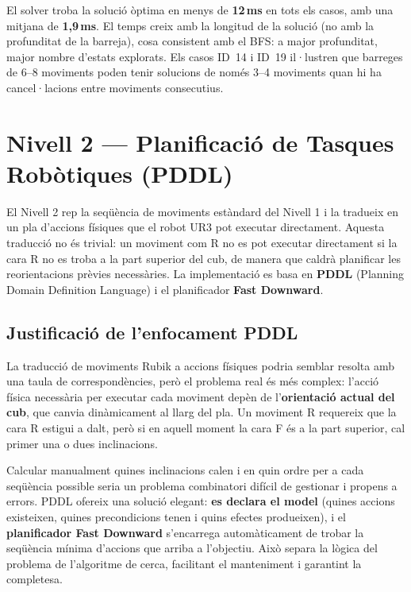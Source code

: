 \documentclass[12pt, a4paper]{article}
\begin{document}
El solver troba la solució òptima en menys de \textbf{12\,ms} en tots els casos, amb una mitjana de \textbf{1{,}9\,ms}. El temps creix amb la longitud de la solució (no amb la profunditat de la barreja), cosa consistent amb el BFS: a major profunditat, major nombre d'estats explorats. Els casos ID~14 i ID~19 il·lustren que barreges de 6--8 moviments poden tenir solucions de només 3--4 moviments quan hi ha cancel·lacions entre moviments consecutius.

\section{Nivell 2 — Planificació de Tasques Robòtiques (PDDL)}

El Nivell 2 rep la seqüència de moviments estàndard del Nivell 1 i la tradueix en un pla d'accions físiques que el robot UR3 pot executar directament. Aquesta traducció no és trivial: un moviment com R no es pot executar directament si la cara R no es troba a la part superior del cub, de manera que caldrà planificar les reorientacions prèvies necessàries. La implementació es basa en \textbf{PDDL} (Planning Domain Definition Language) i el planificador \textbf{Fast Downward}.

\subsection{Justificació de l'enfocament PDDL}

La traducció de moviments Rubik a accions físiques podria semblar resolta amb una taula de correspondències, però el problema real és més complex: l'acció física necessària per executar cada moviment depèn de l'\textbf{orientació actual del cub}, que canvia dinàmicament al llarg del pla. Un moviment R requereix que la cara R estigui a dalt, però si en aquell moment la cara F és a la part superior, cal primer una o dues inclinacions.

Calcular manualment quines inclinacions calen i en quin ordre per a cada seqüència possible seria un problema combinatori difícil de gestionar i propens a errors. PDDL ofereix una solució elegant: \textbf{es declara el model} (quines accions existeixen, quines precondicions tenen i quins efectes produeixen), i el \textbf{planificador Fast Downward} s'encarrega automàticament de trobar la seqüència mínima d'accions que arriba a l'objectiu. Això separa la lògica del problema de l'algoritme de cerca, facilitant el manteniment i garantint la completesa.
\end{document}
